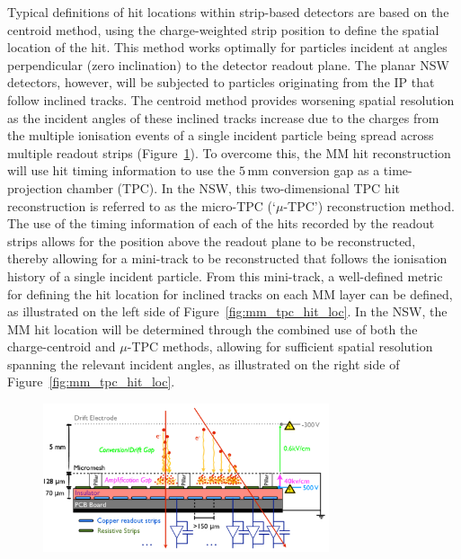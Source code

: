 Typical definitions of hit locations within strip-based detectors are based on the
centroid method, using the charge-weighted strip position to define the spatial location
of the hit.
This method works optimally for particles incident at angles perpendicular (zero inclination) to the detector readout plane.
The planar NSW detectors, however, will be subjected to particles originating from the IP that follow inclined tracks.
The centroid method provides worsening spatial resolution as the incident angles of these inclined tracks increase due
to the charges from the multiple ionisation events of a single incident particle being spread across multiple readout strips (Figure~\ref{fig:nsw_mm_principle}).
To overcome this, the MM hit reconstruction will use hit timing information
to use the $5$\,mm conversion gap as a time-projection chamber (TPC).
In the NSW, this two-dimensional TPC hit reconstruction is referred to as the micro-TPC (`$\mu$-TPC') reconstruction method.
The use of the timing information of each of the hits recorded by the readout strips
allows for the position above the readout plane to be reconstructed, thereby
allowing for a mini-track to be reconstructed that follows the ionisation history
of a single incident particle.
From this mini-track, a well-defined metric for defining the hit location for inclined tracks on
each MM layer can be defined, as illustrated on the left side of Figure~\ref{fig:mm_tpc_hit_loc}.
In the NSW, the MM hit location will be determined through the combined use of both the
charge-centroid and $\mu$-TPC methods, allowing for sufficient spatial resolution spanning the relevant
incident angles, as illustrated on the right side of Figure~\ref{fig:mm_tpc_hit_loc}.


\begin{figure}[!htb]
    \begin{center}
        \includegraphics[width=0.75\textwidth]{figures/nsw/nsw_mm_principle}
        \caption{
        }
        \label{fig:nsw_mm_principle}
    \end{center}
\end{figure}

